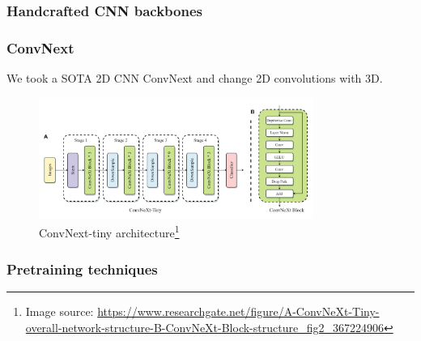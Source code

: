 \documentclass{beamer}
\begin{document}
\begin{frame}
    \frametitle{Handcrafted CNN backbones}

\end{frame}

\begin{frame}
    \frametitle{ConvNext}
    We took a SOTA 2D CNN ConvNext \cite{liu2022convnet} and change 2D convolutions with 3D.
    \begin{figure}
        \includegraphics[width=0.8\textwidth]{convnext.png}
        \caption{ConvNext-tiny architecture\footnote{Image source: \url{https://www.researchgate.net/figure/A-ConvNeXt-Tiny-overall-network-structure-B-ConvNeXt-Block-structure_fig2_367224906}}}
    \end{figure}
\end{frame}

\begin{frame}
    \frametitle{Pretraining techniques}



\end{frame}
\end{document}
